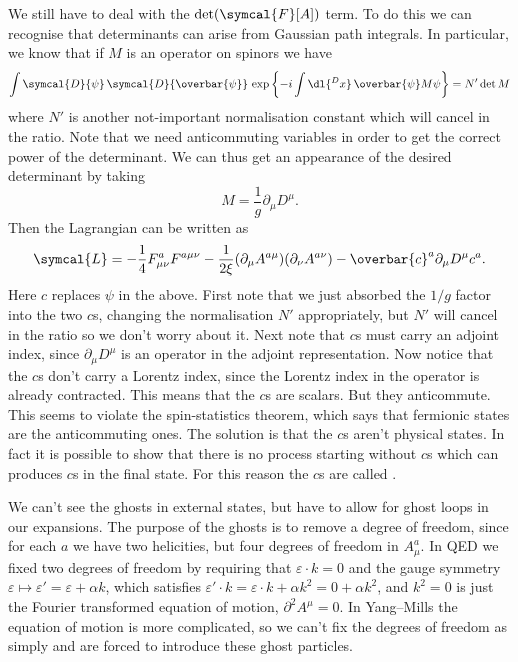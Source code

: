\documentclass[fleqn]{NotesClass}
\newcommand{\diracadjoint}[1]{\overbar{#1}}
\newcommand{\covariantDerivative}{D}
\newcommand{\lagrangianDensity}{\symcal{L}}
\newcommand{\DL}[1]{\symcal{D}{#1}}
\newcommand{\DD}[1]{\,\symcal{D}{#1}}
\newcommand{\dalembertian}{\partial^2}
\begin{document}
    We still have to deal with the \(\det(\symcal{F}[A])\) term.
    To do this we can recognise that determinants can arise from Gaussian path integrals.
    In particular, we know that if \(M\) is an operator on spinors we have
    \begin{equation}
        \int \DL{\psi} \DD{\diracadjoint{\psi}} \, \exp\left\{ -i\int\dl{^Dx} \, \diracadjoint{\psi} M \psi \right\} = N' \det M
    \end{equation}
    where \(N'\) is another not-important normalisation constant which will cancel in the ratio.
    Note that we need anticommuting variables in order to get the correct power of the determinant.
    We can thus get an appearance of the desired determinant by taking 
    \begin{equation}
        M = \frac{1}{g}\partial_\mu \covariantDerivative^\mu.
    \end{equation}
    Then the Lagrangian can be written as
    \begin{equation}
        \lagrangianDensity = -\frac{1}{4}F^a_{\mu\nu}F^{a\mu\nu} - \frac{1}{2\xi}(\partial_\mu A^{a\mu})(\partial_\nu A^{a\nu}) - \diracadjoint{c}^a \partial_\mu \covariantDerivative^\mu c^a.
    \end{equation}
    Here \(c\) replaces \(\psi\) in the above.
    First note that we just absorbed the \(1/g\) factor into the two \(c\)s, changing the normalisation \(N'\) appropriately, but \(N'\) will cancel in the ratio so we don't worry about it.
    Next note that \(c\)s must carry an adjoint index, since \(\partial_\mu \covariantDerivative^\mu\) is an operator in the adjoint representation.
    Now notice that the \(c\)s don't carry a Lorentz index, since the Lorentz index in the operator is already contracted.
    This means that the \(c\)s are scalars.
    But they anticommute.
    This seems to violate the spin-statistics theorem, which says that fermionic states are the anticommuting ones.
    The solution is that the \(c\)s aren't physical states.
    In fact it is possible to show that there is no process starting without \(c\)s which can produces \(c\)s in the final state.
    For this reason the \(c\)s are called .
    
    We can't see the ghosts in external states, but have to allow for ghost loops in our expansions.
    The purpose of the ghosts is to remove a degree of freedom, since for each \(a\) we have two helicities, but four degrees of freedom in \(A^a_\mu\).
    In QED we fixed two degrees of freedom by requiring that \(\varepsilon \cdot k = 0\) and the gauge symmetry \(\varepsilon \mapsto \varepsilon' = \varepsilon + \alpha k\), which satisfies \(\varepsilon' \cdot k = \varepsilon \cdot k + \alpha k^2 = 0 + \alpha k^2\), and \(k^2 = 0\) is just the Fourier transformed equation of motion, \(\dalembertian A^\mu = 0\).
    In Yang--Mills the equation of motion is more complicated, so we can't fix the degrees of freedom as simply and are forced to introduce these ghost particles.
    
\end{document}

